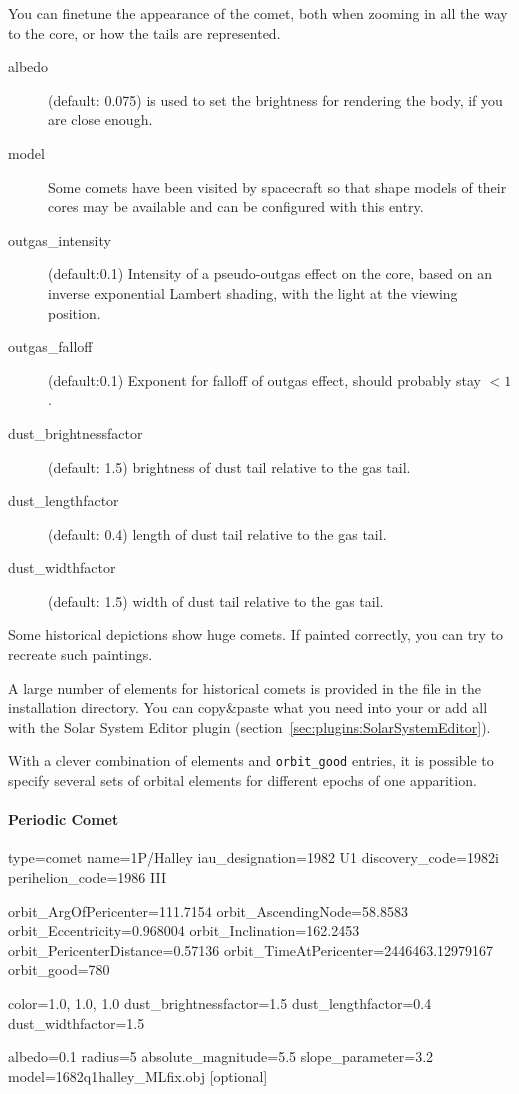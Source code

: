 You can finetune the appearance of the comet, both when zooming in all the way to the core, or how the tails are represented. 
\begin{description}
\item[albedo] (default: 0.075) is used to set the brightness for rendering the body, if you are close enough. 
\item[model] Some comets have been visited by spacecraft so that shape models of their cores 
	may be available and can be configured with this entry.
\item[outgas\_intensity] (default:0.1) Intensity of a pseudo-outgas effect on the core, based on an inverse exponential Lambert shading, with the light at the viewing position.
\item[outgas\_falloff] (default:0.1)  Exponent for falloff of outgas effect, should probably stay $< 1$.
\item[dust\_brightnessfactor] (default: 1.5) brightness of dust tail relative to the gas tail.
\item[dust\_lengthfactor] (default: 0.4) length of dust tail relative to the gas tail.
\item[dust\_widthfactor] (default: 1.5) width of dust tail relative to the gas tail.
\end{description}
Some historical depictions show huge comets. If painted correctly, you can try to recreate such paintings.

A large number of elements for historical comets is provided in the
file  in the installation directory. You
can copy\&paste what you need into your
 or add all with the Solar System Editor plugin (section~\ref{sec:plugins:SolarSystemEditor}). 


With a clever combination of elements and \texttt{orbit\_good}
entries,  it is possible to specify several sets of
orbital elements for different epochs of one apparition.

\paragraph{Periodic Comet}
\label{sec:ssystem.ini:Comet:Periodic}

\begin{configfile}
[1phalley]
type=comet  
name=1P/Halley
iau_designation=1982 U1
discovery_code=1982i
perihelion_code=1986 III

orbit_ArgOfPericenter=111.7154
orbit_AscendingNode=58.8583
orbit_Eccentricity=0.968004
orbit_Inclination=162.2453
orbit_PericenterDistance=0.57136
orbit_TimeAtPericenter=2446463.12979167
orbit_good=780

color=1.0, 1.0, 1.0
dust_brightnessfactor=1.5
dust_lengthfactor=0.4
dust_widthfactor=1.5

albedo=0.1
radius=5
absolute_magnitude=5.5
slope_parameter=3.2
model=1682q1halley_MLfix.obj [optional]
\end{configfile}

